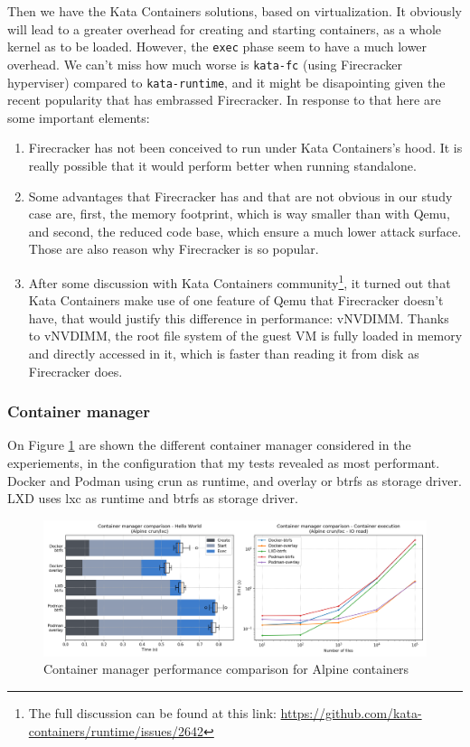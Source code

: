 Then we have the Kata Containers solutions, based on virtualization.  It obviously will lead to a greater overhead for creating and starting containers, as a whole kernel as to be loaded.  However, the \texttt{exec} phase seem to have a much lower overhead.  We can't miss how much worse is \texttt{kata-fc} (using Firecracker hyperviser) compared to \texttt{kata-runtime}, and it might be disapointing given the recent popularity that has embrassed Firecracker.  In response to that here are some important elements:
\begin{enumerate}
  \item Firecracker has not been conceived to run under Kata Containers's hood.  It is really possible that it would perform better when running standalone.
  \item Some advantages that Firecracker has and that are not obvious in our study case are, first, the memory footprint, which is way smaller than with Qemu, and second, the reduced code base, which ensure a much lower attack surface.  Those are also reason why Firecracker is so popular.
  \item After some discussion with Kata Containers community\footnote{The full discussion can be found at this link: \href{https://github.com/kata-containers/runtime/issues/2642}{https://github.com/kata-containers/runtime/issues/2642}}, it turned out that Kata Containers make use of one feature of Qemu that Firecracker doesn't have, that would justify this difference in performance: vNVDIMM.  Thanks to vNVDIMM, the root file system of the guest VM is fully loaded in memory and directly accessed in it, which is faster than reading it from disk as Firecracker does.
\end{enumerate}

\subsubsection{Container manager}

On Figure \ref{fig:q1:manager} are shown the different container manager considered in the experiements, in the configuration that my tests revealed as most performant.  Docker and Podman using crun as runtime, and overlay or btrfs as storage driver.  LXD uses lxc as runtime and btrfs as storage driver.

\begin{figure}[h!]
  \begin{center}
    \includegraphics[width=\linewidth]{images/question-1-manager.png}
    \caption{Container manager performance comparison for Alpine containers}
    \label{fig:q1:manager}
  \end{center}
\end{figure}

